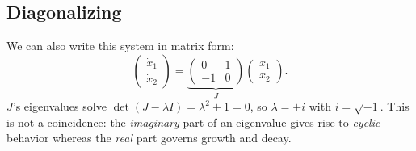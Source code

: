 \subsection{Diagonalizing}
We can also write this system in matrix form:
\[
\begin{pmatrix}\dot x_1 \\ \dot x_2\end{pmatrix}
= \underbrace{\begin{pmatrix}0&1\\-1&0\end{pmatrix}}_{J}
\begin{pmatrix}x_1\\x_2\end{pmatrix}.
\]
$J$'s eigenvalues solve $\det(J-\lambda I)=\lambda^2+1=0$, so
$\lambda=\pm i$ with $i = \sqrt{-1}$. This is not a coincidence: the
\emph{imaginary} part of an eigenvalue gives rise to \emph{cyclic}
behavior whereas the \emph{real} part governs growth and decay.





